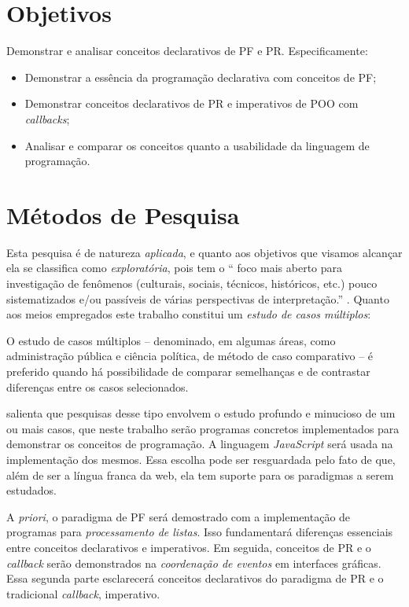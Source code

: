 \section{Objetivos}
\label{sec:org53c7bd7}
Demonstrar e analisar conceitos declarativos de PF e PR. Especificamente:

\begin{itemize}
\item Demonstrar a essência da programação declarativa com conceitos de PF;
\item Demonstrar conceitos declarativos de PR e imperativos de POO com
\emph{callbacks};
\item Analisar e comparar os conceitos quanto a usabilidade da linguagem de
programação.
\end{itemize}

\section{Métodos de Pesquisa}
\label{sec:orgba92f88}
Esta pesquisa é de natureza \emph{aplicada}, e quanto aos objetivos que visamos
alcançar ela se classifica como \emph{exploratória}, pois tem o “\textelp{} foco
mais aberto para investigação de fenômenos (culturais, sociais, técnicos,
históricos, etc.) pouco sistematizados e/ou passíveis de várias perspectivas
de interpretação.” \cite[p. 32]{leal2011}.
Quanto aos meios empregados este trabalho constitui um \emph{estudo de casos
múltiplos}:

\begin{citacao}
  O estudo de casos múltiplos – denominado, em algumas áreas, como
  administração pública e ciência política, de método de caso comparativo – é
  preferido quando há possibilidade de comparar semelhanças e de contrastar
  diferenças entre os casos selecionados. \cite[p. 43]{leal2011}
\end{citacao}

\textcite{yin2001} salienta que pesquisas desse tipo envolvem o estudo profundo
e minucioso de um ou mais casos, que neste trabalho serão programas concretos
implementados para demonstrar os conceitos de programação.
A linguagem \emph{JavaScript} será usada na implementação dos mesmos.
Essa escolha pode ser resguardada pelo fato de que, além de ser a língua
franca da web, ela tem suporte para os paradigmas a serem estudados.

A \emph{priori}, o paradigma de PF será demostrado com a implementação de programas
para \emph{processamento de listas}.
Isso fundamentará diferenças essenciais entre conceitos declarativos e
imperativos.
Em seguida, conceitos de PR e o \emph{callback} serão demonstrados na \emph{coordenação
de eventos} em interfaces gráficas.
Essa segunda parte esclarecerá conceitos declarativos do paradigma de PR e o
tradicional \emph{callback}, imperativo.

